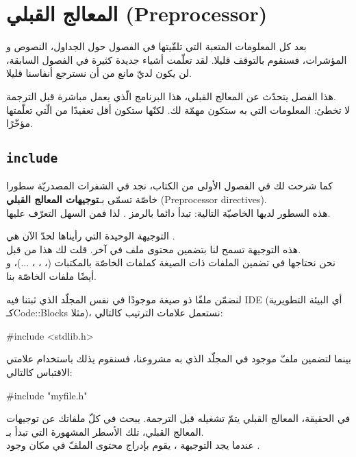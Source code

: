 \chapter{المعالج القبلي (\textenglish{Preprocessor})}

بعد كل المعلومات المتعبة التي تلقّيتها في الفصول حول الجداول، النصوص و المؤشرات، فسنقوم بالتوقف قليلا. لقد تعلّمت أشياء جديدة كثيرة في الفصول السابقة، لن يكون لديّ مانع من أن نسترجع أنفاسنا قليلا.

هذا الفصل يتحدّث عن المعالج القبلي، هذا البرنامج الّذي يعمل مباشرة قبل الترجمة.\\
لا تخطئ: المعلومات التي به ستكون مهمّة لك. لكنّها ستكون أقل تعقيدًا من الّتي تعلّمتها مؤخّرًا.

\section{\texttt{include}}

كما شرحت لك  في الفصول الأولى من الكتاب، نجد في الشفرات المصدريّة سطورا خاصّة تسمّى بـ\textbf{توجيهات المعالج القبلي} (\textenglish{Preprocessor directives}).\\
هذه السطور لديها الخاصيّة التالية: تبدأ دائما بالرمز
\InlineCode{\#}.
لذا فمن السهل التعرّف عليها.

التوجيهة الوحيدة التي رأيناها لحدّ الآن هي
.\\
هذه التوجيهة تسمح لنا بتضمين محتوى ملف في آخر. قلت لك هذا من قبل.\\
نحن نحتاجها في تضمين الملفات ذات الصيغة
كملفات
الخاصّة بالمكتبات
(، ، ، ...)،
و أيضًا ملفات
الخاصّة بنا.

لنضمّن ملفًا ذو صيغة
موجودًا في نفس المجلّد الذي ثبتنا فيه \textenglish{IDE}
(أي البيئة التطويرية كـ\textenglish{Code::Blocks}
مثلا)، نستعمل علامات الترتيب
\InlineCode{< >}
كالتالي:

\begin{Csource}
#include <stdlib.h>
\end{Csource}

بينما لتضمين ملفّ
موجود في المجلّد الذي به مشروعنا، فسنقوم يذلك باستخدام علامتي الاقتباس كالتالي:

\begin{Csource}
#include "myfile.h"
\end{Csource}

في الحقيقة، المعالج القبلي يتمّ تشغيله قبل الترجمة. يبحث في كلّ ملفاتك عن توجيهات المعالج القبلي، تلك الأسطر المشهورة التي تبدأ بـ\InlineCode{\#}.\\
عندما يجد التوجيهة
،
يقوم بإدراج محتوى الملفّ في مكان وجود
.


